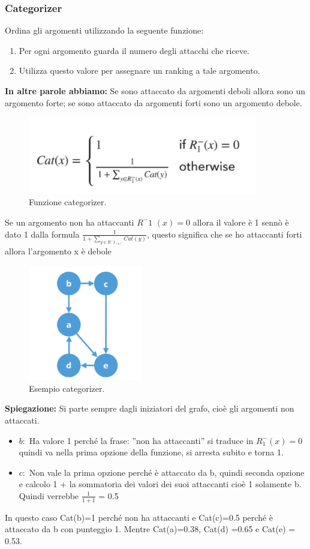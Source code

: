 \subsubsection{Categorizer}
Ordina gli argomenti utilizzando la seguente funzione:
\begin{enumerate}
    \item Per ogni argomento guarda il numero degli attacchi che riceve.
    \item Utilizza questo valore per assegnare un ranking a tale argomento.
\end{enumerate}
\textbf{In altre parole abbiamo:} Se sono attaccato da argomenti deboli
allora sono un argomento forte; se sono attaccato da argomenti forti sono un
argomento debole.
\begin{figure}[htp]
    \centering
    \includegraphics[width=10cm, keepaspectratio]{capitoli/img/Cap8/quantitativo1.png}
    \caption{Funzione categorizer.}
\end{figure}
Se un argomento non ha attaccanti $R^-1$ $(x) = 0$ allora il valore è 1
sennò è dato 1 dalla formula $\frac{1}{1+\sum_{y\in R^-1_(x)} Cat(y)}$, questo
significa che se ho attaccanti forti allora l'argomento x è debole

\begin{figure}[htp]
    \centering
    \includegraphics[width=5cm, keepaspectratio]{capitoli/img/Cap8/quantitativo2.png}
    \caption{Esempio categorizer.}
\end{figure}
\noindent \textbf{Spiegazione: } Si parte sempre dagli iniziatori del grafo,
cioè gli argomenti non attaccati.
\begin{itemize}
    \item $b:$ Ha valore 1 perché la frase: ”non ha attaccanti” si traduce
          in $R^-_1(x) = 0$ quindi va nella prima opzione della funzione, si
          arresta subito e torna 1.
    \item $c:$ Non vale la prima opzione perché è attaccato da b, quindi
          seconda opzione e calcolo 1 + la sommatoria dei valori dei suoi
          attaccanti cioè 1 solamente b. Quindi verrebbe $\frac{1}{1+1}$ = 0.5
\end{itemize}
In questo caso Cat(b)=1 perché non ha attaccanti e Cat(c)=0.5 perché è
attaccato da b con punteggio 1. Mentre Cat(a)=0.38, Cat(d) =0.65 e Cat(e) =
0.53.

